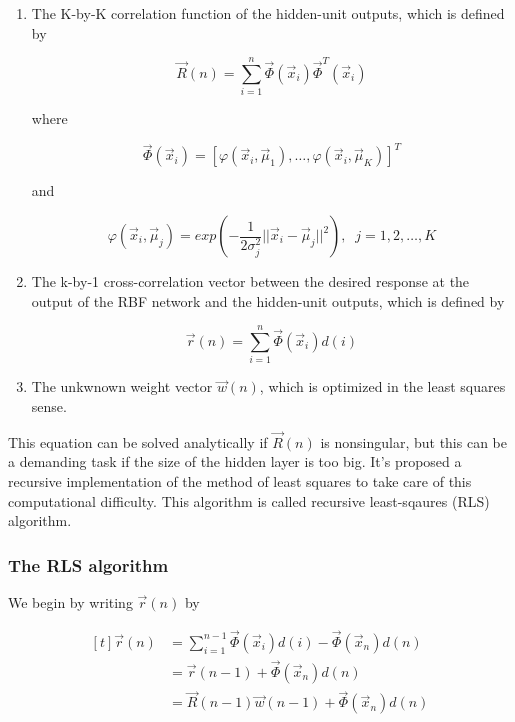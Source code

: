 \documentclass{article}
\begin{document}
\begin{enumerate}
	\item The K-by-K correlation function of the hidden-unit outputs, which is defined by

		$$ \vec{R} (n) = \displaystyle\sum_{i = 1}^{n}  \vec{\Phi} ( \vec{x}_{i}) \vec{\Phi}^{T} ( \vec{x}_{i}) $$

		\noindent where

		$$ \vec{\Phi} ( \vec{x}_{i}) = [ \varphi ( \vec{x}_{i}, \vec{\mu}_{1}), \ldots, \varphi ( \vec{x}_{i}, \vec{\mu}_{K})]^{T} $$

		\noindent and

		$$ \varphi ( \vec{x}_{i}, \vec{\mu}_{j}) = exp ( - \dfrac{1}{2\sigma_{j}^{2}} || \vec{x}_{i} - \vec{\mu}_{j}||^{2}), \;\; j = 1, 2, \ldots, K $$

	\item The k-by-1 cross-correlation vector between the desired response at the output of the RBF network and the hidden-unit outputs, which is defined by

		$$ \vec{r} (n) = \displaystyle\sum_{i = 1}^{n} \vec{\Phi} ( \vec{x}_{i}) d (i) $$

	\item The unkwnown weight vector $ \vec{w} (n) $, which is optimized in the least squares sense.
\end{enumerate}

This equation can be solved analytically if $ \vec{R} (n) $ is nonsingular, but this can be a demanding task if the size of the hidden layer is too big. It's proposed a recursive implementation of the method of least squares to take care of this computational difficulty. This algorithm is called recursive least-sqaures (RLS) algorithm.

\subsubsection{The RLS algorithm}

We begin by writing $ \vec{r} (n) $ by

$$ 
\begin{aligned}[t]
	\vec{r} (n) &= \displaystyle\sum_{i = 1}^{n - 1} \vec{\Phi} ( \vec{x}_{i})d (i) - \vec{\Phi} ( \vec{x}_{n})d (n) \\
		    &= \vec{r} (n - 1) + \vec{\Phi} ( \vec{x}_{n}) d (n) \\
		    &= \vec{R} (n - 1) \vec{w} (n - 1) + \vec{\Phi} ( \vec{x}_{n}) d (n) 
\end{aligned}
$$
\end{document}
